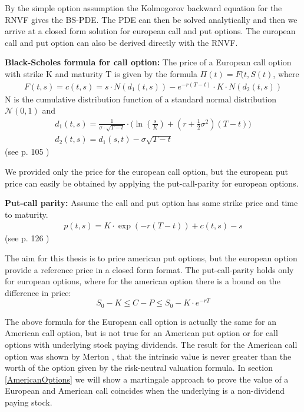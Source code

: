 By the simple option assumption the Kolmogorov backward equation for the RNVF gives the BS-PDE. The PDE can then be solved analytically and then we arrive at a closed form solution for european call and put options. The european call and put option can also be derived directly with the RNVF. 

\theoremstyle{proposition}
\begin{proposition}{}\label{BS-price-EuroCall}
\textbf{Black-Scholes formula for call option:} The price of a European call option with strike K and maturity T is given by the formula  $\Pi(t)=F(t,S(t)$, where
\begin{align*}
F(t,s)=c(t,s)=s \cdot N(d_1(t,s)) - e^{-r(T-t)}\cdot K \cdot N(d_2(t,s))
\end{align*}
N is the cumulative distribution function of a standard normal distribution $\mathcal{N}(0,1)$ and
\begin{align*}
d_1(t,s)=\frac{1}{\sigma\cdot \sqrt{T-t}} \cdot \bigg( \ln(\frac{s}{K}) + (r+\frac{1}{2} \sigma^2) (T-t) \bigg)\\
d_2(t,s)=d_1(s,t)-\sigma \sqrt{T-t}
\end{align*}
(see p. 105 \parencite{finKont})
\end{proposition}
We provided only the price for the european call option, but the european put price can easily be obtained by applying the put-call-parity for european options.

\theoremstyle{proposition}
\begin{proposition}{}\label{put-call-parity}
\textbf{Put-call parity:} 
Assume the call and put option has same strike price and time to maturity.
\begin{align*}
p(t,s)=K\cdot \exp(-r(T-t))+c(t,s)-s
\end{align*}
(see p. 126 \parencite{finKont})
\end{proposition}

The aim for this thesis is to price american put options, but the european option provide a reference price in a closed form format. The put-call-parity holds only for european options, where for the american option there is a bound on the difference in price:
$$S_0 - K \leq C-P \leq S_0 - K \cdot e^{-rT}$$

The above formula for the European call option is actually the same for an American call option, but is not true for an American put option or for call options with underlying stock paying dividends. The result for the American call option was shown by Merton \parencite{Merton73}, that the intrinsic value is never greater than the worth of the option given by the risk-neutral valuation formula. In section \ref{AmericanOptions} we will show a martingale approach to prove the value of a European and American call coincides when the underlying is a non-dividend paying stock.

